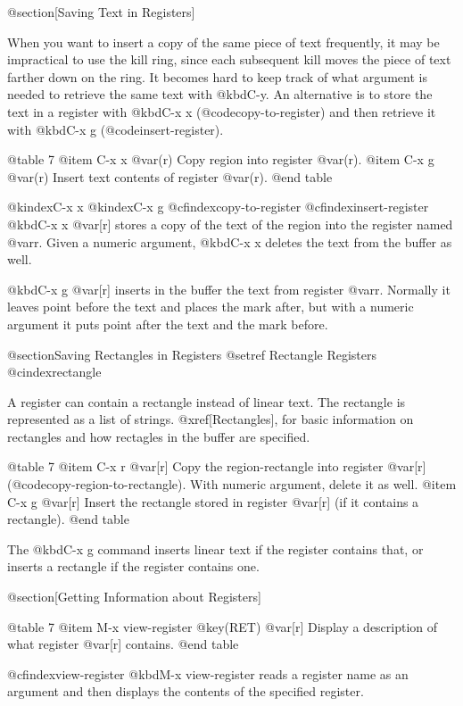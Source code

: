 {{{{{{@section[Saving Text in Registers]

  When you want to insert a copy of the same piece of text frequently, it
may be impractical to use the kill ring, since each subsequent kill moves
the piece of text farther down on the ring.  It becomes hard to keep track
of what argument is needed to retrieve the same text with @kbd{C-y}.  An
alternative is to store the text in a register with @kbd{C-x x}
(@code{copy-to-register}) and then retrieve it with @kbd{C-x g}
(@code{insert-register}).

@table 7
@item C-x x @var(r)
Copy region into register @var(r).
@item C-x g @var(r)
Insert text contents of register @var(r).
@end table

@kindex{C-x x}
@kindex{C-x g}
@cfindex{copy-to-register}
@cfindex{insert-register}
  @kbd{C-x x @var[r]} stores a copy of the text of the region into the
register named @var{r}.  Given a numeric argument, @kbd{C-x x} deletes the
text from the buffer as well.

  @kbd{C-x g @var[r]} inserts in the buffer the text from register @var{r}.
Normally it leaves point before the text and places the mark after, but
with a numeric argument it puts point after the text and the mark before.

@section{Saving Rectangles in Registers}
@setref Rectangle Registers
@cindex{rectangle}

  A register can contain a rectangle instead of linear text.  The rectangle
is represented as a list of strings.  @xref[Rectangles], for basic
information on rectangles and how rectagles in the buffer are specified.

@table 7
@item C-x r @var[r]
Copy the region-rectangle into register @var[r]
(@code{copy-region-to-rectangle}).  With numeric argument, delete it as well.
@item C-x g @var[r]
Insert the rectangle stored in register @var[r] (if it contains a
rectangle).
@end table

  The @kbd{C-x g} command inserts linear text if the register contains
that, or inserts a rectangle if the register contains one.

@section[Getting Information about Registers]

@table 7
@item M-x view-register @key(RET) @var[r]
Display a description of what register @var[r] contains.
@end table

@cfindex{view-register}
  @kbd{M-x view-register} reads a register name as an argument and then
displays the contents of the specified register.

}}}}}}
